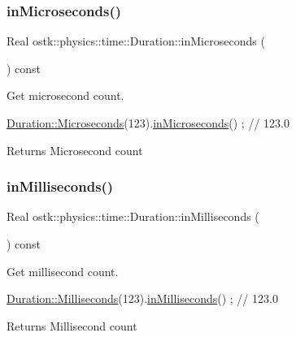 \subsubsection{\texorpdfstring{in\+Microseconds()}{inMicroseconds()}}
{\footnotesize\ttfamily Real ostk\+::physics\+::time\+::\+Duration\+::in\+Microseconds (\begin{DoxyParamCaption}{ }\end{DoxyParamCaption}) const}



Get microsecond count. 


\begin{DoxyCode}
\hyperlink{classostk_1_1physics_1_1time_1_1_duration_ab63d75db1524c35849385e07c0dc261a}{Duration::Microseconds}(123).\hyperlink{classostk_1_1physics_1_1time_1_1_duration_a67a7723ff079f5a4404a5fa1b0fd2128}{inMicroseconds}() ; \textcolor{comment}{// 123.0}
\end{DoxyCode}


\begin{DoxyReturn}{Returns}
Microsecond count 
\end{DoxyReturn}
\mbox{\label{classostk_1_1physics_1_1time_1_1_duration_a8a754e57d49d857d7fbcd62be81b858d}} 
\subsubsection{\texorpdfstring{in\+Milliseconds()}{inMilliseconds()}}
{\footnotesize\ttfamily Real ostk\+::physics\+::time\+::\+Duration\+::in\+Milliseconds (\begin{DoxyParamCaption}{ }\end{DoxyParamCaption}) const}



Get millisecond count. 


\begin{DoxyCode}
\hyperlink{classostk_1_1physics_1_1time_1_1_duration_a0712e9c93f9be6ca4d837998fda90e7a}{Duration::Milliseconds}(123).\hyperlink{classostk_1_1physics_1_1time_1_1_duration_a8a754e57d49d857d7fbcd62be81b858d}{inMilliseconds}() ; \textcolor{comment}{// 123.0}
\end{DoxyCode}


\begin{DoxyReturn}{Returns}
Millisecond count 
\end{DoxyReturn}
\mbox{\label{classostk_1_1physics_1_1time_1_1_duration_a8ad5153d6f3ee225d9e4c32a2e19febc}} 
